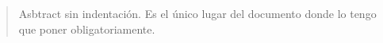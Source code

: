 \begin{abstract}
\noindent Asbtract sin indentación. Es el único lugar del documento donde lo tengo que poner obligatoriamente.
\end{abstract}
\clearpage